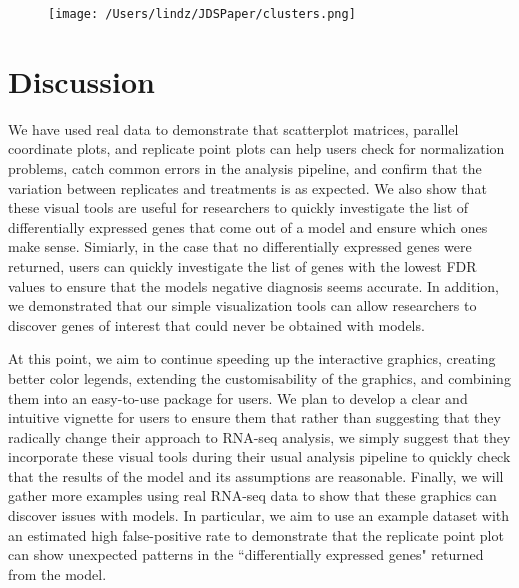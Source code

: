\documentclass[useAMS,referee]{biom}
\begin{document}
\begin{figure}
\begin{center}
\centerline{\texttt{[image: /Users/lindz/JDSPaper/clusters.png]}}
\end{center}
\caption{
\label{clusters}}
\end{figure}

\pagebreak

\section{Discussion}
\label{s:discuss}

We have used real data to demonstrate that scatterplot matrices, parallel coordinate plots, and replicate point plots can help users check for normalization problems, catch common errors in the analysis pipeline, and confirm that the variation between replicates and treatments is as expected. We also show that these visual tools are useful for researchers to quickly investigate the list of differentially expressed genes that come out of a model and ensure which ones make sense. Simiarly, in the case that no differentially expressed genes were returned, users can quickly investigate the list of genes with the lowest FDR values to ensure that the models negative diagnosis seems accurate. In addition, we demonstrated that our simple visualization tools can allow researchers to discover genes of interest that could never be obtained with models.

At this point, we aim to continue speeding up the interactive graphics, creating better color legends, extending the customisability of the graphics, and combining them into an easy-to-use package for users. We plan to develop a clear and intuitive vignette for users to ensure them that rather than suggesting that they radically change their approach to RNA-seq analysis, we simply suggest that they incorporate these visual tools during their usual analysis pipeline to quickly check that the results of the model and its assumptions are reasonable. Finally, we will gather more examples using real RNA-seq data to show that these graphics can discover issues with models. In particular, we aim to use an example dataset with an estimated high false-positive rate to demonstrate that the replicate point plot can show unexpected patterns in the ``differentially expressed genes" returned from the model.


\end{document}
